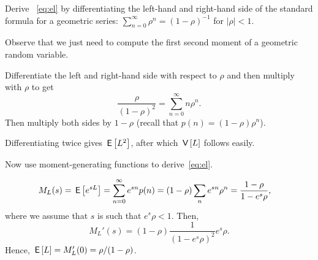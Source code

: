 \begin{exercise} 
Derive ~\cref{eq:el} by differentiating the left-hand and right-hand side of
 the standard formula for a geometric series: $\sum_{n=0}^{\infty}\rho^n = (1-\rho)^{-1}$ for $|\rho| < 1$. 
\begin{hint}
 Observe that we just need to compute the first second moment of a geometric random variable.
\end{hint}
\begin{solution}
Differentiate the left and right-hand side with respect to
$\rho$ and then multiply with $\rho$ to get
\begin{equation*}
\dfrac{\rho}{(1-\rho)^2}=\sum_{n=0}^{\infty}n\rho^n.
\end{equation*}
Then multiply both sides by $1-\rho$ (recall that $p(n) = (1-\rho)\rho^n$).

Differentiating twice gives $\,\mathsf{E}\left[L^2\right]$, after which $\,\mathsf{V}\left[L\right]$ follows easily.
\end{solution}
\end{exercise}

\begin{extra}
 Now use moment-generating functions to derive~\cref{eq:el}. 
\begin{solution}
\begin{equation*}
 \begin{split}
 M_L(s) 
&= \,\mathsf{E}\left[e^{s L}\right] = \sum_{n=0}^\infty e^{s n}p(n) = (1-\rho) \sum_n e^{s n} \rho^n=\frac{1-\rho}{1-e^{s}\rho},
 \end{split}
\end{equation*}
where we assume that $s$ is such that $e^s \rho < 1$. Then, 
\begin{equation*}
 M_L'(s) = (1-\rho) \frac{1}{(1-e^s\rho)^2} e^s \rho.
\end{equation*}
Hence, $\,\mathsf{E}\left[L\right] = M_L'(0) = \rho/(1-\rho)$.
\end{solution}
\end{extra}



